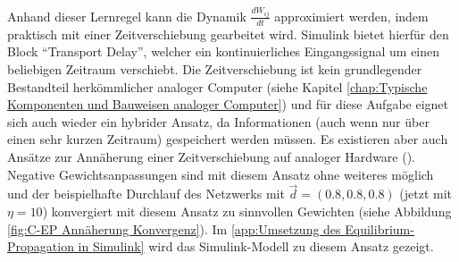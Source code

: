 Anhand dieser Lernregel kann die Dynamik \(\frac{dW_{ij}}{dt}\) approximiert werden, indem praktisch mit einer Zeitverschiebung gearbeitet wird. Simulink bietet hierfür den Block "`Transport Delay"', welcher ein kontinuierliches Eingangssignal um einen beliebigen Zeitraum verschiebt. Die Zeitverschiebung ist kein grundlegender Bestandteil herkömmlicher analoger Computer (siehe Kapitel \ref{chap:Typische Komponenten und Bauweisen analoger Computer}) und für diese Aufgabe eignet sich auch wieder ein hybrider Ansatz, da Informationen (auch wenn nur über einen sehr kurzen Zeitraum) gespeichert werden müssen. Es existieren aber auch Ansätze zur Annäherung einer Zeitverschiebung auf analoger Hardware (\cite[vgl. S. 117 ff.]{Ulmann2022}). Negative Gewichtsanpassungen sind mit diesem Ansatz ohne weiteres möglich und der beispielhafte Durchlauf des Netzwerks mit \(\vec{d}=(0.8,0.8,0.8)\) (jetzt mit \(\eta=10\)) konvergiert mit diesem Ansatz zu sinnvollen Gewichten (siehe Abbildung \ref{fig:C-EP Annäherung Konvergenz}). Im \ref{app:Umsetzung des Equilibrium-Propagation in Simulink} wird das Simulink-Modell zu diesem Ansatz gezeigt.


